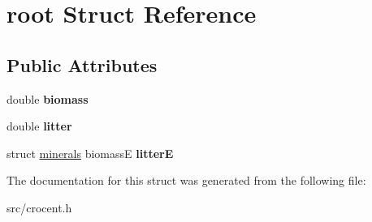\hypertarget{structroot}{\section{root Struct Reference}
\label{structroot}
}
\subsection*{Public Attributes}
\begin{DoxyCompactItemize}
\item 
\hypertarget{structroot_afd6c7f381a228033fed5f89a6134bf53}{double {\bfseries biomass}}\label{structroot_afd6c7f381a228033fed5f89a6134bf53}

\item 
\hypertarget{structroot_ae886b5abf202f29627881db1f03b40c8}{double {\bfseries litter}}\label{structroot_ae886b5abf202f29627881db1f03b40c8}

\item 
\hypertarget{structroot_a8ebdceb048958007607713768c9a419a}{struct \hyperlink{structminerals}{minerals} biomass\-E {\bfseries litter\-E}}\label{structroot_a8ebdceb048958007607713768c9a419a}

\end{DoxyCompactItemize}


The documentation for this struct was generated from the following file\-:\begin{DoxyCompactItemize}
\item 
src/crocent.\-h\end{DoxyCompactItemize}
